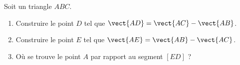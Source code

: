 
\begin{exercice}\label{exosmath-0066}

    Soit un triangle \( ABC\).
    \begin{enumerate}
        \item
            Construire le point \( D\) tel que \( \vect{ AD }=\vect{ AC }-\vect{ AB }\).
        \item
            Construire le point \( E\) tel que \( \vect{ AE }=\vect{ AB }-\vect{ AC }\).
        \item
            Où se trouve le point \( A\) par rapport au segment \( [ED]\) ?
    \end{enumerate}

\end{exercice}
